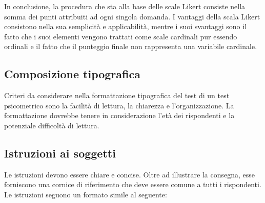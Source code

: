 In conclusione, la procedura che sta alla base delle scale Likert consiste nella somma dei punti attribuiti ad ogni singola domanda. I vantaggi della scala Likert consistono nella sua semplicità e applicabilità, mentre i suoi svantaggi sono il fatto che i suoi elementi vengono trattati come scale cardinali pur essendo ordinali e il fatto che il punteggio finale non rappresenta una variabile cardinale. 

\subsection{Composizione tipografica}

Criteri da considerare nella formattazione tipografica del test di un test psicometrico sono la facilità di lettura, la chiarezza e l'organizzazione. La formattazione dovrebbe tenere in considerazione l'età dei rispondenti e la potenziale difficoltà di lettura.

\subsection{Istruzioni ai soggetti}

Le istruzioni devono essere chiare e concise. Oltre ad illustrare la consegna, esse forniscono una cornice di riferimento che deve essere comune a tutti i rispondenti. Le istruzioni seguono un formato simile al seguente:

